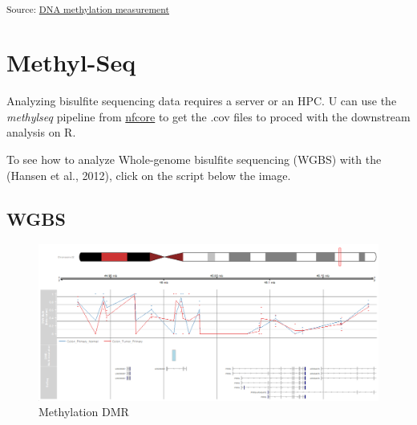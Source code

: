 \documentclass[
]{agujournal2019}
\begin{document}
\textsubscript{Source:
\href{https://pipaber.github.io/Epigenomics/notebooks/Methylation_multiresolution_analysis-preview.html\#cell-Island-status}{DNA
methylation measurement}}

\section{Methyl-Seq}\label{methyl-seq}

Analyzing bisulfite sequencing data requires a server or an HPC. U can
use the \emph{methylseq} pipeline from
\href{https://nf-co.re/methylseq/2.6.0}{nfcore} to get the .cov files to
proced with the downstream analysis on R.

To see how to analyze Whole-genome bisulfite sequencing (WGBS) with the
(Hansen et al., 2012), click on the script below the image.

\subsection{WGBS}\label{wgbs}

\begin{figure}[H]

{\centering \includegraphics{notebooks/track_methyl_seq_plot.png}

}

\caption{Methylation DMR}

\end{figure}%
\end{document}

